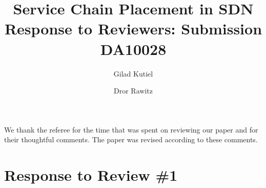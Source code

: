 \documentclass[11pt]{article}
\begin{document}
\title{\textbf{Service Chain Placement in SDN} \\
  {\Large Response to Reviewers: Submission DA10028}}

\author{Gilad Kutiel \and Dror Rawitz}

\maketitle


We thank the referee for the time that was spent on reviewing our
paper and for their thoughtful comments.  The paper was revised
according to these comments.


\medskip

\section*{Response to Review \#1}
\end{document}
